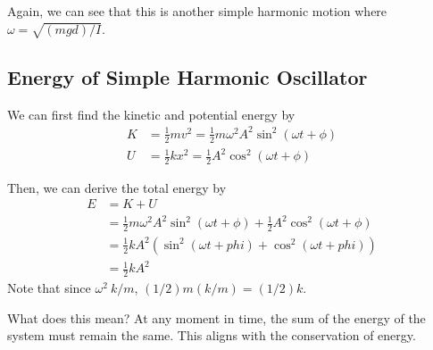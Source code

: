 Again, we can see that this is another simple harmonic motion where $\omega = \sqrt{(mgd)/I}$.

\subsection{Energy of Simple Harmonic Oscillator}

We can first find the kinetic and potential energy by
\begin{align*}
    K &= \frac{1}{2}mv^2 = \frac{1}{2}m\omega^2A^2\sin^2(\omega t + \phi)\\
    U &= \frac{1}{2}kx^2 = \frac{1}{2}A^2\cos^2(\omega t + \phi)
\end{align*}

Then, we can derive the total energy by
\begin{align*}
    E &= K + U\\
    &= \frac{1}{2}m\omega^2A^2\sin^2(\omega t + \phi) + \frac{1}{2}A^2\cos^2(\omega t + \phi)\\
    &= \frac{1}{2}kA^2 ( \sin^2(\omega t + phi) + \cos^2(\omega t + phi))\\
    &= \frac{1}{2}kA^2
\end{align*}
Note that since $\omega^2 \ k / m$, $(1/2)m(k/m) = (1/2)k$.

What does this mean? At any moment in time, the sum of the energy of the system must remain the same.
This aligns with the conservation of energy.